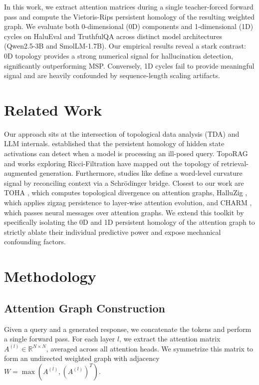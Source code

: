 \documentclass[11pt,a4paper]{article}
\begin{document}
In this work, we extract attention matrices during a single teacher-forced forward pass and compute the Vietoris-Rips persistent homology of the resulting weighted graph. We evaluate both 0-dimensional (0D) components and 1-dimensional (1D) cycles on HaluEval and TruthfulQA across distinct model architectures (Qwen2.5-3B and SmolLM-1.7B). Our empirical results reveal a stark contrast: 0D topology provides a strong numerical signal for hallucination detection, significantly outperforming MSP. Conversely, 1D cycles fail to provide meaningful signal and are heavily confounded by sequence-length scaling artifacts. 

\section{Related Work}
Our approach sits at the intersection of topological data analysis (TDA) and LLM internals. \cite{jiang2026} established that the persistent homology of hidden state activations can detect when a model is processing an ill-posed query. TopoRAG \citep{toporag} and works exploring Ricci-Filtration \citep{ricci} have mapped out the topology of retrieval-augmented generation. Furthermore, studies like \citep{curvature} define a word-level curvature signal by reconciling context via a Schrödinger bridge. Closest to our work are TOHA \citep{toha}, which computes topological divergence on attention graphs, HalluZig \citep{halluzig}, which applies zigzag persistence to layer-wise attention evolution, and CHARM \citep{charm}, which passes neural messages over attention graphs. We extend this toolkit by specifically isolating the 0D and 1D persistent homology of the attention graph to strictly ablate their individual predictive power and expose mechanical confounding factors.

\section{Methodology}
\subsection{Attention Graph Construction}
Given a query and a generated response, we concatenate the tokens and perform a single forward pass. For each layer $l$, we extract the attention matrix $A^{(l)} \in \mathbb{R}^{N \times N}$, averaged across all attention heads. We symmetrize this matrix to form an undirected weighted graph with adjacency $W = \max(A^{(l)}, (A^{(l)})^T)$.
\end{document}
